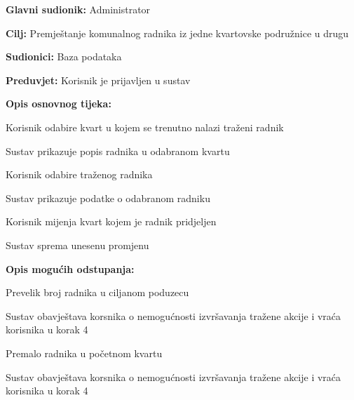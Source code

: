 	\noindent {}
					\begin{packed_item}
	
						\item \textbf{Glavni sudionik: }Administrator
						\item  \textbf{Cilj:} Premještanje komunalnog radnika iz jedne kvartovske podružnice u drugu
						\item  \textbf{Sudionici:} Baza podataka
						\item  \textbf{Preduvjet:} Korisnik je prijavljen u sustav
						\item  \textbf{Opis osnovnog tijeka:}
						
						\item[] \begin{packed_enum}
	
							\item Korisnik odabire kvart u kojem se trenutno nalazi traženi radnik
							\item Sustav prikazuje popis radnika u odabranom kvartu
							\item Korisnik odabire traženog radnika 
							\item Sustav prikazuje podatke o odabranom radniku
							\item Korisnik mijenja kvart kojem je radnik pridjeljen
							\item Sustav sprema unesenu promjenu
						\end{packed_enum}
						
						\item  \textbf{Opis mogućih odstupanja:}
						
						\item[] \begin{packed_item}
	
							\item[5.a] Prevelik broj radnika u ciljanom poduzecu
							
							\item[] \begin{packed_enum}
								
								\item Sustav obavještava korsnika o nemogućnosti izvršavanja tražene akcije i vraća korisnika u korak 4
								
								
							\end{packed_enum}
							\item[5.b] Premalo radnika u početnom kvartu
							
								\item[] \begin{packed_enum}
								
								\item Sustav obavještava korsnika o nemogućnosti izvršavanja tražene akcije i vraća korisnika u korak 4
								
								
							\end{packed_enum}
							
						\end{packed_item}
					\end{packed_item}

